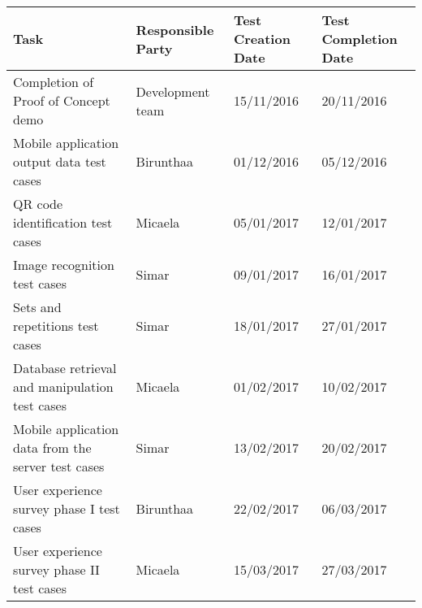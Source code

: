 \begingroup
\begin{center}
\begin{tabular}{p{5cm} p{2cm} p{3cm} p{3cm}}
    \hline
    \textbf{Task} & \textbf{Responsible Party} & \textbf{Test Creation Date} & \textbf{Test Completion Date}\\
    \hline
    Completion of Proof of Concept demo & Development team & 15/11/2016 & 20/11/2016 \\

    Mobile application output data  test cases & Birunthaa & 01/12/2016 & 05/12/2016 \\

    QR code identification test cases & Micaela & 05/01/2017 & 12/01/2017 \\

    Image recognition test cases & Simar & 09/01/2017 & 16/01/2017 \\
    
    Sets and repetitions test cases & Simar	& 18/01/2017 & 27/01/2017 \\

    Database retrieval and manipulation test cases & Micaela & 01/02/2017 & 10/02/2017\\

    Mobile application data from the server  test cases & Simar & 13/02/2017 & 20/02/2017\\
 
    User experience survey phase I test cases & Birunthaa & 22/02/2017 & 06/03/2017 \\

    User experience survey phase II test cases & Micaela & 15/03/2017 & 27/03/2017 \\
    \hline
\end{tabular}
\end{center}
\endgroup




